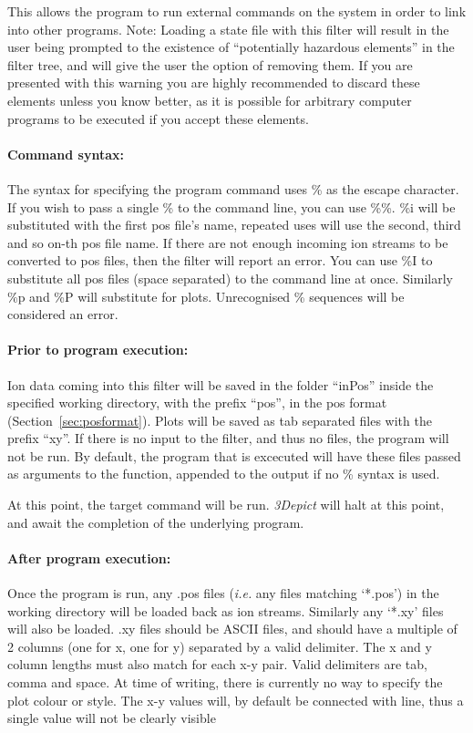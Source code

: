 \documentclass[10pt]{article}
\begin{document}
This allows the program to run external commands on the system in order to link into other programs. Note: Loading a state file with this filter will result in the user being prompted to the existence of ``potentially hazardous elements'' in the filter tree, and will give the user the option of removing them. If you are presented with this warning you are highly recommended to discard these elements unless you know better, as it is possible for arbitrary computer programs to be executed if you accept these elements.


\paragraph{Command syntax: } The syntax for specifying the program command uses \% as the escape character. If you wish to pass a single \% to the command line, you can use \%\%. \%i will be substituted with the first pos file's name, repeated uses will use the second, third and so on-th pos file name. If there are not enough incoming ion streams to be converted to pos files, then the filter will report an error. You can use \%I to substitute all pos files (space separated) to the command line at once. Similarly \%p and \%P will substitute for plots. Unrecognised \% sequences will be considered an error.

\paragraph{Prior to program execution:} Ion data coming into this filter will be saved in the folder ``inPos'' inside the  specified working directory, with the prefix ``pos'', in the pos format (Section~\ref{sec:posformat}).  Plots will be saved as tab separated files with the prefix ``xy''. If there is no input to the filter, and thus no files, the program will not be run. By default, the program that is excecuted will have these files passed as arguments to the function, appended to the output if no \% syntax is used. 

At this point, the target command will be run. \emph{3Depict} will halt at this point, and await the completion of the underlying program.

\paragraph{After program execution:} Once the program is run, any .pos files (\emph{i.e.} any files matching `*.pos') in the working directory will be loaded back as ion streams. Similarly any `*.xy' files will also be loaded. .xy files should be ASCII files, and should have a multiple of 2 columns (one for x, one for y) separated by a valid delimiter. The x and y column lengths must also match for each x-y pair. Valid delimiters are tab, comma and space. At time of writing, there is currently no way to specify the plot colour or style. The x-y values will, by default be connected with line, thus a single value will not be clearly visible
\end{document}
